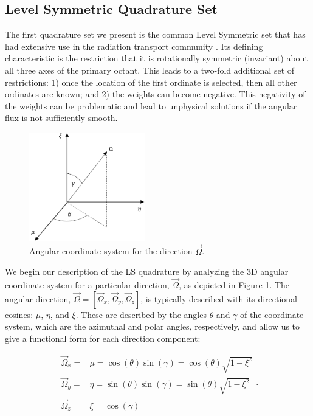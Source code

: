 \subsection{Level Symmetric Quadrature Set}
\label{sec::Sn_Angle_LS}

The first quadrature set we present is the common Level Symmetric set that has had extensive use in the radiation transport community \cite{lewis1984computational,carlson1968computing}. Its defining characteristic is the restriction that it is rotationally symmetric (invariant) about all three axes of the primary octant. This leads to a two-fold additional set of restrictions: 1) once the location of the first ordinate is selected, then all other ordinates are known; and 2) the weights can become negative. This negativity of the weights can be problematic and lead to unphysical solutions if the angular flux is not sufficiently smooth.

\begin{figure}
\centering
\includegraphics[width=0.45\textwidth]{figures/sec_Sn/Ang_Quad_Coord_Sys.png}
\caption[Angular Coordinate System]{Angular coordinate system for the direction $\vec{\Omega}$.}
\label{fig::Ang_Coord_Sys}
\end{figure}

We begin our description of the LS quadrature by analyzing the 3D angular coordinate system for a particular direction, $\vec{\Omega}$, as depicted in Figure \ref{fig::Ang_Coord_Sys}. The angular direction, $\vec{\Omega} = [\vec{\Omega}_x, \vec{\Omega}_y, \vec{\Omega}_z]$, is typically described with its directional cosines: $\mu$, $\eta$, and $\xi$. These are described by the angles $\theta$ and $\gamma$ of the coordinate system, which are the azimuthal and polar angles, respectively, and allow us to give a functional form for each direction component:

\begin{equation}
\label{eq::Sn_Angle_angle_components}
\begin{aligned}
\vec{\Omega}_x =& \mu = \cos (\theta) \sin (\gamma)  =\cos (\theta)  \sqrt{1 - \xi^2}  \\
\vec{\Omega}_y =& \eta = \sin (\theta) \sin (\gamma)  =\sin (\theta)   \sqrt{1 - \xi^2}   \\
\vec{\Omega}_z =& \xi = \cos (\gamma)
\end{aligned} .
\end{equation}

